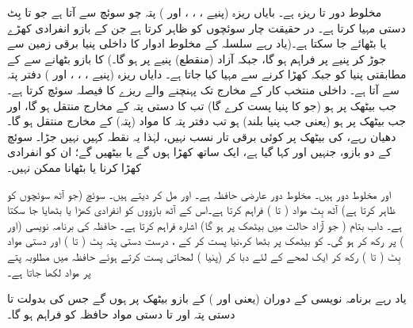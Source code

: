  مخلوط دور      تا  ریزہ ہے۔ بایاں ریزہ (پنیے ، ، ، اور )  پتہ  چو سوئچ  سے آتا ہے جو  تا  بِٹ دستی  مہیا کرتا ہے۔  در حقیقت چار سوئچوں کو ظاہر کرتا ہے جن کے بازو انفرادی کھڑے یا  بٹھائے جا سکتا ہے۔(یاد رہے    سلسلہ کے مخلوط ادوار کا داخلی  پنیا برقی زمین سے جوڑ کر  پنیے پر     فراہم  ہو گا، جبکہ آزاد (منقطع)   پنیے   پر   ہو گا۔)       کا  بازو  بٹھانے سے  کے مطابقتی پنیا کو   جبکہ کھڑا کرنے سے     مہیا کیا جاتا ہے۔  دایاں ریزہ (پنیے ، ، ، اور ) دفتر پتہ  سے آتا ہے۔ داخلی منتخب کار   کے مخارج تک پہنچنے والے ریزے   کا فیصلہ سوئچ   کرتا ہے۔ جب      بیٹھک پر   ہو  (جو   کا پنیا  پست کرے گا) تب  کا  دستی پتہ   کے مخارج   منتقل ہو گا، اور جب     بیٹھک پر ہو (یعنی جب پنیا   بلند)    ہو تب دفتر پتہ  کا مواد  (پتہ)  کے مخارج  منتقل ہو گا۔دھیان رہے،    کی  بیٹھک پر کوئی برقی تار نسب نہیں، لہٰذا یہ نقطہ کہیں نہیں جڑا۔ سوئچ   کے دو بازو، جنہیں  اور  کہا گیا ہے، ایک ساتھ کھڑا ہوں گے یا بیٹھیں گے؛ ان کو انفرادی کھڑا کرنا  یا بٹھانا ممکن  نہیں۔
 
    اور  مخلوط دور  ہیں۔   مخلوط دور  عارضی حافظہ ہے۔   اور  مل کر   دیتے ہیں۔ سوئچ    (جو آٹھ سوئچوں کو ظاہر کرتا ہے)  آٹھ بِٹ مواد ( تا )  فراہم کرتا ہے۔اس کے آٹھ بازووں کو انفرادی کھڑا یا بٹھایا جا  سکتا  ہے۔ داب بتام   ( جو آزاد حالت میں  بیٹھک پر ہو گا)          اشارہ فراہم کرتا ہے۔ حافظہ کی برنامہ نویسی    (اور )    پر رکھ کر ہو گی۔ کو    بیٹھک پر بٹھا کر،نیا پست کر کے ،  درست دستی پتہ   بِٹ  (     تا )  اور   دستی مواد بِٹ  ( تا )       رکھ کر   ایک لمحے کے لئے دبا کر  (پنیا )    لمحاتی پست  کرتے ہوئے حافظہ میں  مطلوبہ پتے   پر مواد لکھا جاتا ہے۔
   
یاد رہے برنامہ نویسی کے دوران   (یعنی  اور ) کے بازو  بیٹھک پر ہوں گے جس کی بدولت  تا  دستی  پتہ اور  تا  دستی  مواد حافظہ کو فراہم ہو گا۔
   
